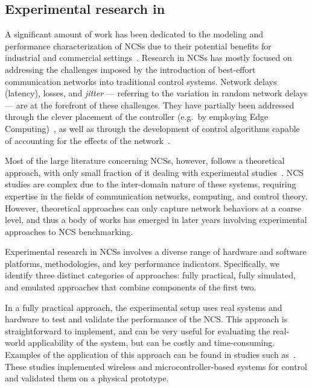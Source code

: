 \subsection{Experimental research in }

A significant amount of work has been dedicated to the modeling and performance characterization of \glspl{NCS} due to their potential benefits for industrial and commercial settings~\cite{lu2016real,hespanha2007survey,zhang2013network,zhang2016survey}.
Research in \glspl{NCS} has mostly focused on addressing the challenges imposed by the introduction of best-effort communication networks into traditional control systems.
Network delays (latency), losses, and \emph{jitter} --- referring to the variation in random network delays --- are at the forefront of these challenges.
They have partially been addressed through the clever placement of the controller (e.g.\ by employing Edge Computing)~\cite{sasaki2017layered,sasaki2016vehicle}, as well as through the development of control algorithms capable of accounting for the effects of the network~\cite{zhang2013network}.

Most of the large literature concerning \glspl{NCS}, however, follows a theoretical approach, with only small fraction of it dealing with experimental studies~\cite{zhang2019networked}.
\gls{NCS} studies are complex due to the inter-domain nature of these systems, requiring expertise in the fields of communication networks, computing, and control theory.
However, theoretical approaches can only capture network behaviors at a coarse level, and thus a body of works has emerged in later years involving experimental approaches to \gls{NCS} benchmarking.

Experimental research in \glspl{NCS} involves a diverse range of hardware and software platforms, methodologies, and key performance indicators.
Specifically, we identify three distinct categories of approaches: fully practical, fully simulated, and emulated approaches that combine components of the first two.

In a fully practical approach, the experimental setup uses real systems and hardware to test and validate the performance of the \gls{NCS}.
This approach is straightforward to implement, and can be very useful for evaluating the real-world applicability of the system, but can be costly and time-consuming.
Examples of the application of this approach can be found in studies such as~\cite{drew2005networked,baumann2018evaluating,li2014wireless,cuenca2019periodic}.
These studies implemented wireless and microcontroller-based systems for control and validated them on a physical prototype.

